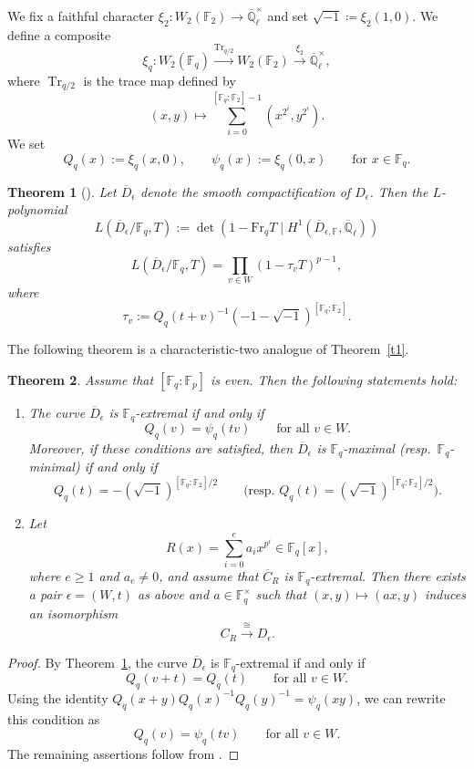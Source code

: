 \documentclass[12pt,a4paper]{amsart}
\newtheorem{theorem}{Theorem}[section]
\theoremstyle{definition}
\def\F{{\mathbb F}}
\def\Ql{\overline{\mathbb{Q}}_\ell}
\theoremstyle{remark}
\DeclareMathOperator{\Tr}{Tr}
\begin{document}
We fix a faithful character $\xi_2 \colon W_2(\F_2) \to \Ql^{\times}$ and set $\sqrt{-1}\coloneqq \xi_2(1,0)$. 
We define a composite 
\[
\xi_q \colon W_2(\F_q) \xrightarrow{\Tr_{q/2}} 
W_2(\F_2) \xrightarrow{\xi_2} \Ql^{\times}, 
\]
where $\Tr_{q/2}$ is the trace map defined by 
\[
(x,y) \mapsto \sum_{i=0}^{[\F_q:\F_2]-1}(x^{2^i}, y^{2^i}).
\]
We set 
\[
Q_q(x):=\xi_q(x,0), \qquad \psi_q(x):=\xi_q(0,x) \qquad \textrm{for $x \in \F_q$}. 
\]
\begin{theorem}[{\cite[Theorem~4.12]{ITT1}}]\label{twist}
Let $\overline{D}_\epsilon$ denote the smooth compactification of $D_\epsilon$. Then the $L$-polynomial 
\[
L(\overline{D}_{\epsilon}/\F_q, T):=\det(1-\mathrm{Fr}_q T \mid 
H^1(\overline{D}_{\epsilon,\F},\Ql)) 
\]
satisfies 
\[
L(\overline{D}_{\epsilon}/\F_q, T)=
 \prod_{v \in W}
(1-\tau_{v} T)^{p-1},
\]
where 
\[
\tau_{v}:=Q_q(t+v)^{-1} (-1-\sqrt{-1})^{[\F_q:\F_2]}. 
\]
\end{theorem}

The following theorem is a characteristic-two analogue of Theorem~\ref{t1}. 
\begin{theorem}\label{recipe for ex curve intro}
Assume that $[\F_q:\F_p]$ is even. Then the following statements hold: 
\begin{enumerate}
    \item The curve $\overline{D}_{\epsilon}$ is $\F_q$-extremal if and only if 
    \[
    Q_q(v)=\psi_q(tv)\qquad\text{for all } v\in W. 
    \]
    Moreover, if these conditions are satisfied, then 
    $\overline{D}_{\epsilon}$ is $\F_q$-maximal (resp.\ $\F_q$-minimal) if and only if 
    \[
    Q_q(t)=-(\sqrt{-1})^{[\F_q:\F_2]/2}\qquad\text{(resp.\ }Q_q(t)=(\sqrt{-1})^{[\F_q:\F_2]/2}\text{)}. 
    \]
    \item Let 
\[R(x)=\sum_{i=0}^e a_i x^{p^i} \in 
 \F_q[x],\]
 where $e\geq1$ and $a_e\neq0$, and assume that $\overline{C}_R$ is $\F_q$-extremal. Then there exists a pair $\epsilon=(W,t)$ as above and $a\in\F_q^\times$ such that $(x,y)\mapsto (ax,y)$ induces an isomorphism 
 \[ C_R\xrightarrow{\cong}D_{\epsilon}.
 \]
\end{enumerate}
\end{theorem}
\begin{proof}
By Theorem~\ref{twist}, the curve $\overline{D}_\epsilon$ is $\F_q$-extremal if and only if 
\[
Q_q(v+t)=Q_q(t)\qquad\text{for all }v\in W. 
\]
Using the identity $Q_q(x+y)Q_q(x)^{-1}Q_q(y)^{-1}=\psi_q(xy)$, we can rewrite this condition as 
\[
Q_q(v)=\psi_q(tv)\qquad\text{for all }v\in W.
\]
The remaining assertions follow from \cite[Theorem~1.3]{ITT1}. 
\end{proof}
\end{document}
